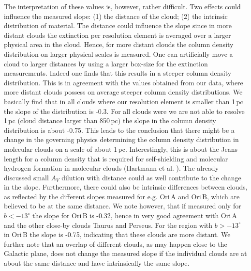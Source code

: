 \documentclass[useAMS,usenatbib]{mn2e}
\begin{document}
The interpretation of these values is, however, rather difficult. Two effects
could influence the measured slope: (1) the distance of the cloud; (2) the
intrinsic distribution of material. The distance could influence the slope since
in more distant clouds the extinction per resolution element is averaged over a
larger physical area in the cloud. Hence, for more distant clouds the column
density distribution on larger physical scales is measured. One can artificially
move a cloud to larger distances by using a larger box-size for the extinction
measurements. Indeed one finds that this results in a steeper column density
distribution. This is in agreement with the values obtained from our data, where
more distant clouds possess on average steeper column density distributions. We
basically find that in all clouds where our resolution element is smaller than
1\,pc the slope of the distribution is -0.3. For all clouds were we are not able
to resolve 1\,pc (cloud distance larger than 850\,pc) the slope in the column
density distribution is about -0.75. This leads to the conclusion that there
might be a change in the governing physics determining the column density
distribution in molecular clouds on a scale of about 1\,pc. Interestingly, this
is about the Jeans length for a column density that is required for
self-shielding and molecular hydrogen formation in molecular clouds (Hartmann et
al. \cite{2001ApJ...562..852H}). The already discussed small $A_V$ dilution
with distance could as well contribute to the change in the slope. Furthermore,
there could also be intrinsic differences between clouds, as reflected by the
different slopes measured for e.g. Ori\,A and Ori\,B, which are believed to be
at the same distance. We note however, that if measured only for $b < -13^\circ$
the slope for Ori\,B is -0.32, hence in very good agreement with Ori\,A and the
other close-by clouds Taurus and Perseus. For the region with $b > -13^\circ$ in
Ori\,B the slope is -0.75, indicating that these clouds are more distant. We
further note that an overlap of different clouds, as may happen close to the
Galactic plane, does not change the measured slope if the individual clouds are
at about the same distance and have intrinsically the same slope.
\end{document}
